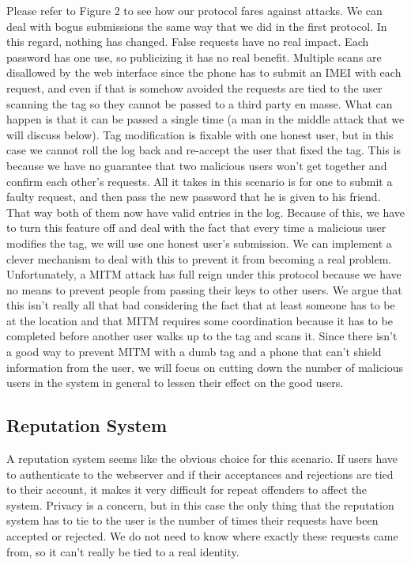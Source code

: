 \documentclass{sig-alternate}
\begin{document}
Please refer to Figure 2 to see how our protocol fares against
attacks. We can deal with bogus submissions the same way that we did
in the first protocol. In this regard, nothing has changed. False
requests have no real impact. Each password has one use, so
publicizing it has no real benefit. Multiple scans are disallowed by
the web interface since the phone has to submit an IMEI with each
request, and even if that is somehow avoided the requests are tied to
the user scanning the tag so they cannot be passed to a third party en
masse. What can happen is that it can be passed a single time (a man
in the middle attack that we will discuss below). Tag modification is
fixable with one honest user, but in this case we cannot roll the log
back and re-accept the user that fixed the tag. This is because we
have no guarantee that two malicious users won't get together and
confirm each other's requests. All it takes in this scenario is for
one to submit a faulty request, and then pass the new password that he
is given to his friend. That way both of them now have valid entries
in the log. Because of this, we have to turn this feature off and deal
with the fact that every time a malicious user modifies the tag, we
will use one honest user's submission. We can implement a clever
mechanism to deal with this to prevent it from becoming a real
problem. Unfortunately, a MITM attack has full reign under this
protocol because we have no means to prevent people from passing their
keys to other users. We argue that this isn't really all that bad
considering the fact that at least someone has to be at the location
and that MITM requires some coordination because it has to be
completed before another user walks up to the tag and scans it. Since
there isn't a good way to prevent MITM with a dumb tag and a phone
that can't shield information from the user, we will focus on cutting
down the number of malicious users in the system in general to lessen
their effect on the good users.

\subsection{Reputation System}
A reputation system seems like the obvious choice for this
scenario. If users have to authenticate to the webserver and if their
acceptances and rejections are tied to their account, it makes it very
difficult for repeat offenders to affect the system. Privacy is a
concern, but in this case the only thing that the reputation system
has to tie to the user is the number of times their requests have been
accepted or rejected. We do not need to know where exactly these
requests came from, so it can't really be tied to a real identity.
\end{document}
